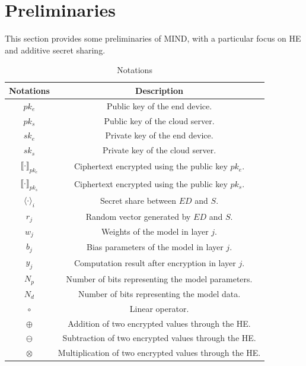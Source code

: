 \documentclass[conference]{IEEEtran}
\begin{document}
\section{Preliminaries}
This section provides some preliminaries of MIND, with a particular focus on HE and additive secret sharing.
\begin{table}[h]
\centering
\caption{Notations}
\label{table:notations}
\begin{tabular}{c|c}
\toprule
\textbf{Notations} & \textbf{Description} \\ 
\midrule
$pk_e$                                   & Public key of the end device. \\
$pk_s$                                   & Public key of the cloud server. \\
$sk_e$                                   & Private key of the end device. \\
$sk_s$                                   & Private key of the cloud server. \\
$\llbracket \cdot \rrbracket_{pk_e}$     & Ciphertext encrypted using the public key $pk_e$. \\
$\llbracket \cdot \rrbracket_{pk_s}$     & Ciphertext encrypted using the public key $pk_s$. \\
$\langle \cdot \rangle_i$                & Secret share between $ED$ and $S$. \\
$r_j$                                    & Random vector generated by $ED$ and $S$. \\
$w_j$                                    & Weights of the model in layer $j$. \\
$b_j$                                    & Bias parameters of the model in layer $j$. \\
$y_j$                                    & Computation result after encryption in layer $j$. \\
$N_{p}$                                  & Number of bits representing the model parameters. \\
$N_{d}$                                  & Number of bits representing the model data. \\
$\circ$                                  & Linear operator. \\
$\oplus$                                 & Addition of two encrypted values through the HE. \\
$\ominus$                                & Subtraction of two encrypted values through the HE. \\
$\otimes$                                & Multiplication of two encrypted values through the HE. \\
\bottomrule
\end{tabular}
\end{table}
\end{document}
